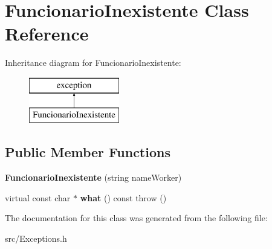 \hypertarget{class_funcionario_inexistente}{}\section{Funcionario\+Inexistente Class Reference}
\label{class_funcionario_inexistente}
Inheritance diagram for Funcionario\+Inexistente\+:\begin{figure}[H]
\begin{center}
\leavevmode
\includegraphics[height=2.000000cm]{class_funcionario_inexistente}
\end{center}
\end{figure}
\subsection*{Public Member Functions}
\begin{DoxyCompactItemize}
\item 
\hypertarget{class_funcionario_inexistente_a9efc9a1af26f64b0167a3ef37dbd95fb}{}{\bfseries Funcionario\+Inexistente} (string name\+Worker)\label{class_funcionario_inexistente_a9efc9a1af26f64b0167a3ef37dbd95fb}

\item 
\hypertarget{class_funcionario_inexistente_ae49d5868c8871518c5404a79d360892d}{}virtual const char $\ast$ {\bfseries what} () const   throw ()\label{class_funcionario_inexistente_ae49d5868c8871518c5404a79d360892d}

\end{DoxyCompactItemize}


The documentation for this class was generated from the following file\+:\begin{DoxyCompactItemize}
\item 
src/Exceptions.\+h\end{DoxyCompactItemize}
